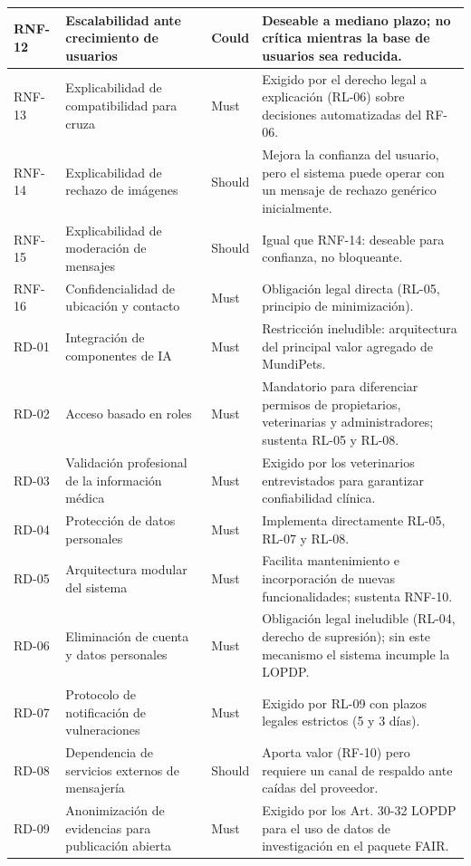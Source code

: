 \documentclass[journal,onecolumn]{IEEEtran}
\begin{document}
\begin{longtable}{@{}p{1.6cm} p{4.8cm} p{1.6cm} p{5.2cm}@{}}
		\hline
		RNF-12 & Escalabilidad ante crecimiento de usuarios & Could & Deseable a mediano plazo; no crítica mientras la base de usuarios sea reducida. \\
		\hline
		RNF-13 & Explicabilidad de compatibilidad para cruza & Must & Exigido por el derecho legal a explicación (RL-06) sobre decisiones automatizadas del RF-06. \\
		\hline
		RNF-14 & Explicabilidad de rechazo de imágenes & Should & Mejora la confianza del usuario, pero el sistema puede operar con un mensaje de rechazo genérico inicialmente. \\
		\hline
		RNF-15 & Explicabilidad de moderación de mensajes & Should & Igual que RNF-14: deseable para confianza, no bloqueante. \\
		\hline
		RNF-16 & Confidencialidad de ubicación y contacto & Must & Obligación legal directa (RL-05, principio de minimización). \\
		\hline
		RD-01 & Integración de componentes de IA & Must & Restricción ineludible: arquitectura del principal valor agregado de MundiPets. \\
		\hline
		RD-02 & Acceso basado en roles & Must & Mandatorio para diferenciar permisos de propietarios, veterinarias y administradores; sustenta RL-05 y RL-08. \\
		\hline
		RD-03 & Validación profesional de la información médica & Must & Exigido por los veterinarios entrevistados para garantizar confiabilidad clínica. \\
		\hline
		RD-04 & Protección de datos personales & Must & Implementa directamente RL-05, RL-07 y RL-08. \\
		\hline
		RD-05 & Arquitectura modular del sistema & Must & Facilita mantenimiento e incorporación de nuevas funcionalidades; sustenta RNF-10. \\
		\hline
		RD-06 & Eliminación de cuenta y datos personales & Must & Obligación legal ineludible (RL-04, derecho de supresión); sin este mecanismo el sistema incumple la LOPDP. \\
		\hline
		RD-07 & Protocolo de notificación de vulneraciones & Must & Exigido por RL-09 con plazos legales estrictos (5 y 3 días). \\
		\hline
		RD-08 & Dependencia de servicios externos de mensajería & Should & Aporta valor (RF-10) pero requiere un canal de respaldo ante caídas del proveedor. \\
		\hline
		RD-09 & Anonimización de evidencias para publicación abierta & Must & Exigido por los Art. 30-32 LOPDP para el uso de datos de investigación en el paquete FAIR. \\

\end{longtable}
\end{document}

